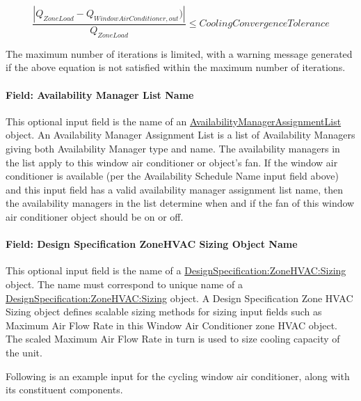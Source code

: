 \begin{equation}
\frac{{\left| {{Q_{ZoneLoad}} - {Q_{WindowAirConditioner,out}})} \right|}}{{{Q_{ZoneLoad}}}} \le Cooling Convergence Tolerance
\end{equation}

The maximum number of iterations is limited, with a warning message generated if the above equation is not satisfied within the maximum number of iterations.

\paragraph{Field: Availability Manager List Name}\label{field-availability-manager-list-name-5}

This optional input field is the name of an \hyperref[availabilitymanagerassignmentlist]{AvailabilityManagerAssignmentList} object. An Availability Manager Assignment List is a list of Availability Managers giving both Availability Manager type and name. The availability managers in the list apply to this window air conditioner or object's fan. If the window air conditioner is available (per the Availability Schedule Name input field above) and this input field has a valid availability manager assignment list name, then the availability managers in the list determine when and if the fan of this window air conditioner object should be on or off.

\paragraph{Field: Design Specification ZoneHVAC Sizing Object Name}\label{field-design-specification-zonehvac-sizing-object-name-5}

This optional input field is the name of a \hyperref[designspecificationzonehvacsizing]{DesignSpecification:ZoneHVAC:Sizing} object. The name must correspond to unique name of a \hyperref[designspecificationzonehvacsizing]{DesignSpecification:ZoneHVAC:Sizing} object. A Design Specification Zone HVAC Sizing object defines scalable sizing methods for sizing input fields such as Maximum Air Flow Rate in this Window Air Conditioner zone HVAC object. The scaled Maximum Air Flow Rate in turn is used to size cooling capacity of the unit.

Following is an example input for the cycling window air conditioner, along with its constituent components.

